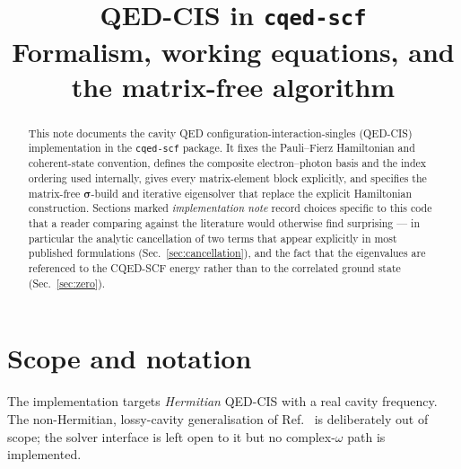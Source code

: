 \documentclass[11pt]{article}
\title{\textbf{QED-CIS in \texttt{cqed-scf}}\\[2pt]
\large Formalism, working equations, and the matrix-free algorithm}
\author{}
\date{}
\begin{document}
\maketitle
\vspace{-3em}

\begin{abstract}
\noindent
This note documents the cavity QED configuration-interaction-singles (QED-CIS)
implementation in the \texttt{cqed-scf} package. It fixes the Pauli--Fierz
Hamiltonian and coherent-state convention, defines the composite
electron--photon basis and the index ordering used internally, gives every
matrix-element block explicitly, and specifies the matrix-free
$\bm{\sigma}$-build and iterative eigensolver that replace the explicit
Hamiltonian construction. Sections marked \emph{implementation note} record
choices specific to this code that a reader comparing against the literature
would otherwise find surprising --- in particular the analytic cancellation of
two terms that appear explicitly in most published formulations
(Sec.~\ref{sec:cancellation}), and the fact that the eigenvalues are referenced
to the CQED-SCF energy rather than to the correlated ground state
(Sec.~\ref{sec:zero}).
\end{abstract}

\tableofcontents
\bigskip

\section{Scope and notation}

The implementation targets \emph{Hermitian} QED-CIS with a real cavity frequency.
The non-Hermitian, lossy-cavity generalisation of Ref.~\cite{McTague2022}
is deliberately out of scope; the solver interface is left open to it but no
complex-$\omega$ path is implemented.
\end{document}
